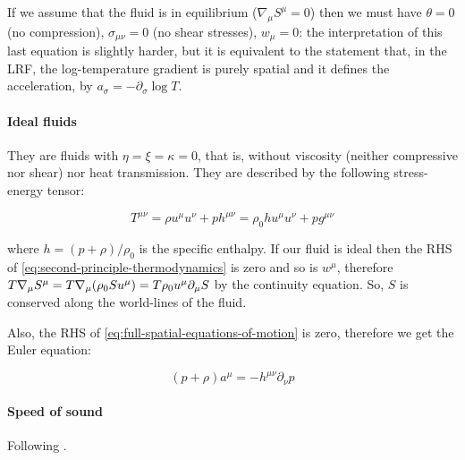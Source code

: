 \documentclass[main.tex]{subfiles}
\begin{document}
If we assume that the fluid is in equilibrium (\(\nabla_\mu S^\mu = 0\)) then we must have \(\theta = 0\) (no compression), \(\sigma_{\mu\nu} = 0 \) (no shear stresses), \(w_\mu=0\): the interpretation of this last equation is slightly harder, but it is equivalent to the statement that, in the LRF, the log-temperature gradient is purely spatial and it defines the acceleration, by \(a_\sigma = - \partial_\sigma \log T\).

%


\paragraph{Ideal fluids}

They are fluids with \(\eta=\xi=\kappa=0\), that is, without viscosity (neither compressive nor shear) nor heat transmission.
They are described by the following stress-energy tensor:

\begin{equation}
    T^{\mu\nu} = \rho u^\mu u^\nu + p h^{\mu\nu} = \rho_0 h u^{\mu} u^\nu + p g^{\mu\nu}
\end{equation}

where \(h = (p + \rho) / \rho_0\) is the specific enthalpy.
If our fluid is ideal then the RHS of \eqref{eq:second-principle-thermodynamics} is zero and so is \(w^\mu\),
therefore \(T \nabla_\mu S^\mu = T \nabla_\mu \qty(\rho_0 S u^\mu) = T \rho_0 u^\mu \partial_\mu S\) by the continuity equation.
So, \(S\) is conserved along the world-lines of the fluid.

Also, the RHS of \eqref{eq:full-spatial-equations-of-motion} is zero, therefore we get the Euler equation:

\begin{equation} \label{eq:relativistic-euler}
    (p+\rho) a^\mu = - h^{\mu \nu} \partial_\nu p
\end{equation}

\paragraph{Speed of sound}

Following \cite[]{Yoshida:2011}.
\end{document}
